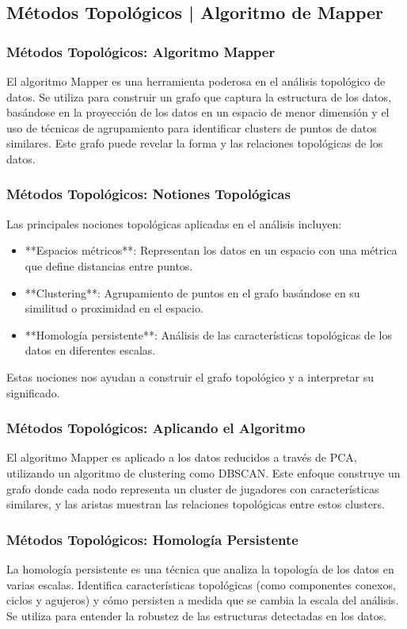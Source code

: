 \documentclass[11pt]{beamer}
\begin{document}
        \subsection{Métodos Topológicos | Algoritmo de Mapper}
        \begin{frame}
            \frametitle{Métodos Topológicos: Algoritmo Mapper}
            El algoritmo Mapper es una herramienta poderosa en el análisis topológico de datos. Se utiliza para construir un grafo que captura la estructura de los datos, basándose en la proyección de los datos en un espacio de menor dimensión y el uso de técnicas de agrupamiento para identificar clusters de puntos de datos similares. Este grafo puede revelar la forma y las relaciones topológicas de los datos.
        \end{frame}
        \begin{frame}
            \frametitle{Métodos Topológicos: Notiones Topológicas}
            Las principales nociones topológicas aplicadas en el análisis incluyen:
            \begin{itemize}
                \item **Espacios métricos**: Representan los datos en un espacio con una métrica que define distancias entre puntos.
                \item **Clustering**: Agrupamiento de puntos en el grafo basándose en su similitud o proximidad en el espacio.
                \item **Homología persistente**: Análisis de las características topológicas de los datos en diferentes escalas.
            \end{itemize}
            Estas nociones nos ayudan a construir el grafo topológico y a interpretar su significado.
            \end{frame}
    \begin{frame}
    \frametitle{Métodos Topológicos: Aplicando el Algoritmo}
    El algoritmo Mapper es aplicado a los datos reducidos a través de PCA, utilizando un algoritmo de clustering como DBSCAN. Este enfoque construye un grafo donde cada nodo representa un cluster de jugadores con características similares, y las aristas muestran las relaciones topológicas entre estos clusters.
    \end{frame}
    
    \begin{frame}
    \frametitle{Métodos Topológicos: Homología Persistente}
    La homología persistente es una técnica que analiza la topología de los datos en varias escalas. Identifica características topológicas (como componentes conexos, ciclos y agujeros) y cómo persisten a medida que se cambia la escala del análisis. Se utiliza para entender la robustez de las estructuras detectadas en los datos.
    
    \end{frame}
	
\end{document}
